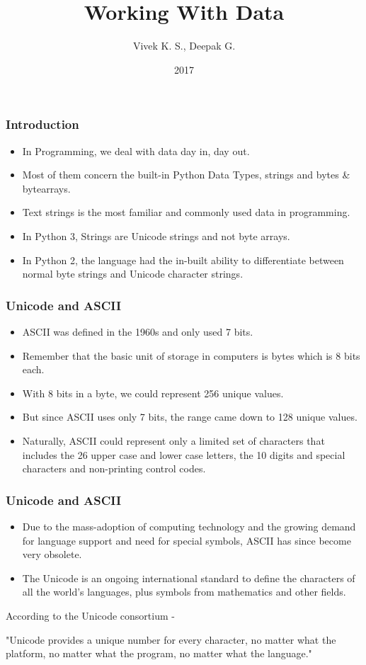 \documentclass{beamer}
\title{Working With Data}
\author{Vivek K. S., Deepak G.}
\institute{Information Systems Decision Sciences (ISDS)\\
MUMA College of Business\\
University of South Florida \\
Tampa, Florida}
\date{2017}
\begin{document}
 
\frame{\titlepage}

\begin{frame}
\frametitle{Introduction}
\begin{itemize}
\item In Programming, we deal with data day in, day out.
\item Most of them concern the built-in Python Data Types, strings and bytes \& bytearrays.
\item Text strings is the most familiar and commonly used data in programming.
\item In Python 3, Strings are Unicode strings and not byte arrays. 
\item In Python 2, the language had the in-built ability to differentiate between normal byte strings and Unicode character strings.

\end{itemize}
\end{frame} 

\begin{frame}
\frametitle{Unicode and ASCII}
\begin{itemize}
\item ASCII was defined in the 1960s and only used 7 bits.
\item Remember that the basic unit of storage in computers is bytes which is 8 bits each.
\item With 8 bits in a byte, we could represent 256 unique values.
\item But since ASCII uses only 7 bits, the range came down to 128 unique values.
\item Naturally, ASCII could represent only a limited set of characters that includes the 26 upper case and lower case letters, the 10 digits and special characters and non-printing control codes.
\end{itemize}
\end{frame}

\begin{frame}
\frametitle{Unicode and ASCII}
\begin{itemize}
\item Due to the mass-adoption of computing technology and the growing demand for language support and need for special symbols, ASCII has since become very obsolete.
\item The Unicode is an ongoing international standard to define the characters of all the world’s languages, plus symbols from mathematics and other fields.
\end{itemize}
According to the Unicode consortium -

"Unicode provides a unique number for every character, no matter what the platform, no
matter what the program, no matter what the language."
\end{frame}
\end{document}
